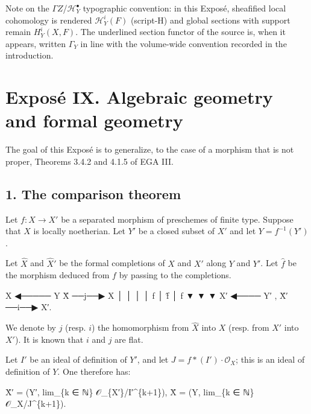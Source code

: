 \documentclass[
  11pt,
  a4paper,
]{book}
\newenvironment{Shaded}{}{}
\newcommand{\NormalTok}[1]{#1}
\begin{document}
Note on the \(\Gamma Z\)/\(\mathcal{H}^{\bullet}_{Y}\) typographic
convention: in this Exposé, sheafified local cohomology is rendered
\(\mathcal{H}^{i}_{Y}(F)\) (script-H) and global sections with support
remain \(H^{i}_{Y}(X, F)\). The underlined section functor of the source
is, when it appears, written \(\Gamma_{Y}\) in line with the volume-wide
convention recorded in the introduction.

\chapter{Exposé IX. Algebraic geometry and formal
geometry}\label{exposuxe9-ix.-algebraic-geometry-and-formal-geometry}

The goal of this Exposé is to generalize, to the case of a morphism that
is not proper, Theorems 3.4.2 and 4.1.5 of EGA III.

\section{1. The comparison theorem}\label{the-comparison-theorem}

Let \(f: X \to X'\) be a separated morphism of preschemes of finite
type. Suppose that \(X\) is locally noetherian. Let \(Y'\) be a closed
subset of \(X'\) and let \(Y = f^{-1}(Y')\).

Let \(\hat{X}\) and \(\hat{X}'\) be the formal completions of \(X\) and
\(X'\) along \(Y\) and \(Y'\). Let \(\hat{f}\) be the morphism deduced
from \(f\) by passing to the completions.

\begin{Shaded}
\begin{Highlighting}[]
\NormalTok{    X ◀───── Y               X̂ ──j──▶  X}
\NormalTok{    │                        │           │}
\NormalTok{    │ f                      │ f̂         │ f}
\NormalTok{    ▼                        ▼           ▼}
\NormalTok{    X′ ◀──── Y′      ,       X̂′ ──i──▶ X′.}
\end{Highlighting}
\end{Shaded}

We denote by \(j\) (resp. \(i\)) the homomorphism from \(\hat{X}\) into
\(X\) (resp. from \(\hat{X}'\) into \(X'\)). It is known that \(i\) and
\(j\) are flat.

Let \(I'\) be an ideal of definition of \(Y'\), and let
\(J = f*(I')\cdot \mathcal{O}_{X}\); this is an ideal of definition of
\(Y\). One therefore has:

\begin{Shaded}
\begin{Highlighting}[]
\NormalTok{X̂′ = (Y′, lim\_\{k ∈ ℕ\} 𝒪\_\{X′\}/I′\^{}\{k+1\}),    X̂ = (Y, lim\_\{k ∈ ℕ\} 𝒪\_X/J\^{}\{k+1\}).}
\end{Highlighting}
\end{Shaded}
\end{document}
